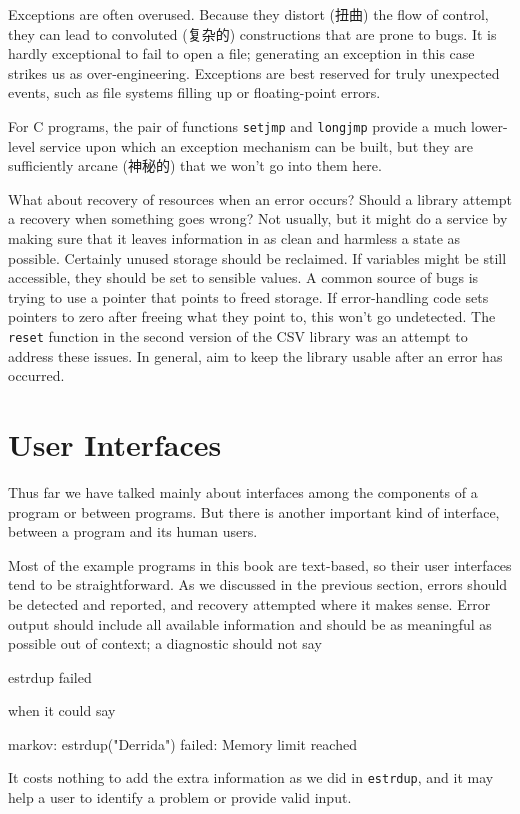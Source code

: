 Exceptions are often overused. Because they distort (扭曲) the flow of
control, they can lead to convoluted (复杂的) constructions that are prone
to bugs. It is hardly exceptional to fail to open a file; generating an
exception in this case strikes us as over-engineering.  Exceptions are best
reserved for truly unexpected events, such as file systems filling up or
floating-point errors.

For C programs, the pair of functions \verb'setjmp' and \verb'longjmp'
provide a much lower-level service upon which an exception mechanism can be
built, but they are sufficiently arcane (神秘的) that we won't go into them
here.

What about recovery of resources when an error occurs? Should a library
attempt a recovery when something goes wrong? Not usually, but it might do
a service by making sure that it leaves information in as clean and
harmless a state as possible.  Certainly unused storage should be
reclaimed. If variables might be still accessible, they should be set to
sensible values. A common source of bugs is trying to use a pointer that
points to freed storage. If error-handling code sets pointers to zero after
freeing what they point to, this won't go undetected. The \verb'reset'
function in the second version of the CSV library was an attempt to address
these issues. In general, aim to keep the library usable after an error has
occurred.

\section{User Interfaces}
\label{sec:user_interfaces}

Thus far we have talked mainly about interfaces among the components of a
program or between programs. But there is another important kind of
interface, between a program and its human users.

Most of the example programs in this book are text-based, so their user
interfaces tend to be straightforward. As we discussed in the previous
section, errors should be detected and reported, and recovery attempted
where it makes sense. Error output should include all available information
and should be as meaningful as possible out of context; a diagnostic should
not say
\begin{wellcode}
    estrdup failed
\end{wellcode}
when it could say
\begin{wellcode}
    markov: estrdup("Derrida") failed: Memory limit reached
\end{wellcode}
It costs nothing to add the extra information as we did in \verb'estrdup',
and it may help a user to identify a problem or provide valid input.

